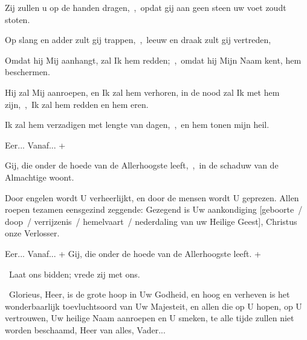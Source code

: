 \documentclass[12pt,twoside,a5paper]{article}
\begin{document}
\begin{halfparskip}
  Zij zullen u op de handen dragen,~\sep\ opdat gij aan geen steen uw voet zoudt stoten.

  Op slang en adder zult gij trappen,~\sep\ leeuw en draak zult gij vertreden,

  Omdat hij Mij aanhangt, zal Ik hem redden;~\sep\ omdat hij Mijn Naam kent, hem beschermen.

  Hij zal Mij aanroepen, en Ik zal hem verhoren, in de nood zal Ik met hem zijn,~\sep\ Ik zal hem redden en hem eren.

  Ik zal hem verzadigen met lengte van dagen,~\sep\ en hem tonen mijn heil.

  \fullline
    

  Eer... Vanaf... + 

   Gij, die onder de hoede van de Allerhoogste leeft,~\sep\ in de schaduw van de Almachtige woont.

   Door engelen wordt U verheerlijkt, en door de mensen wordt U geprezen. Allen roepen tezamen eensgezind zeggende: Gezegend is Uw aankondiging [geboorte~/ doop~/ verrijzenis~/ hemelvaart~/ nederdaling van uw Heilige Geest], Christus onze Verlosser.

  \fullline
   Eer... Vanaf... +  Gij, die onder de hoede van de Allerhoogste leeft. + 
\end{halfparskip}

\begin{halfparskip}
  \fullline
  \dd~Laat ons bidden; vrede zij met ons.

  \cc~Glorieus, Heer, is de grote hoop in Uw Godheid, en hoog en verheven is het wonderbaarlijk toevluchtsoord van Uw Majesteit, en allen die op U hopen, op U vertrouwen, Uw heilige Naam aanroepen en U smeken, te alle tijde zullen niet worden beschaamd, Heer van alles, Vader...
\end{halfparskip}
\end{document}
